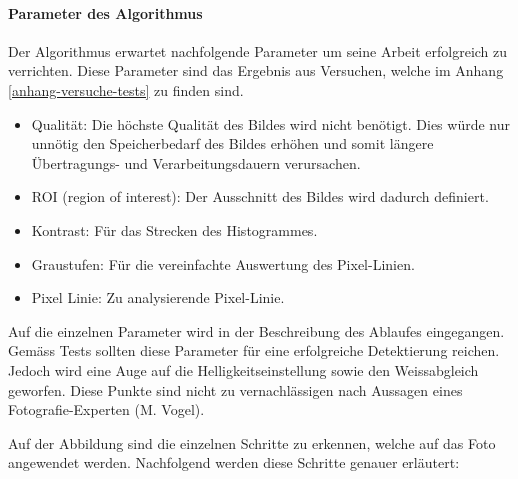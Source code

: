 \paragraph{Parameter des Algorithmus}
Der Algorithmus erwartet nachfolgende Parameter um seine Arbeit erfolgreich zu verrichten. Diese Parameter sind das Ergebnis aus Versuchen, welche im Anhang \ref{anhang-versuche-tests} zu finden sind.

\begin{itemize}
	\item Qualität: Die höchste Qualität des Bildes wird nicht benötigt. Dies würde nur unnötig den Speicherbedarf des Bildes erhöhen und somit längere Übertragungs- und Verarbeitungsdauern verursachen. 
	\item ROI (region of interest): Der Ausschnitt des Bildes wird dadurch definiert.
	\item Kontrast: Für das Strecken des Histogrammes.
	\item Graustufen: Für die vereinfachte Auswertung des Pixel-Linien.
	\item Pixel Linie: Zu analysierende Pixel-Linie.
\end{itemize}

Auf die einzelnen Parameter wird in der Beschreibung des Ablaufes eingegangen. Gemäss Tests sollten diese Parameter für eine erfolgreiche Detektierung reichen. Jedoch wird eine Auge auf die Helligkeitseinstellung sowie den Weissabgleich geworfen. Diese Punkte sind nicht zu vernachlässigen nach Aussagen eines Fotografie-Experten (M. Vogel).

Auf der Abbildung sind die einzelnen Schritte zu erkennen, welche auf das Foto angewendet werden. Nachfolgend werden diese Schritte genauer erläutert:

